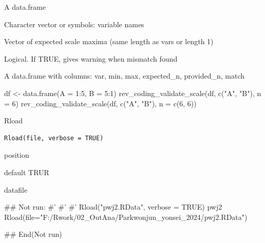 \documentclass[a4paper]{book}
\begin{document}
%
\begin{Arguments}
\begin{ldescription}
\item[\code{data}] A data.frame

\item[\code{vars}] Character vector or symbols: variable names

\item[\code{n}] Vector of expected scale maxima (same length as vars or length 1)

\item[\code{strict}] Logical. If TRUE, gives warning when mismatch found
\end{ldescription}
\end{Arguments}
%
\begin{Value}
A data.frame with columns: var, min, max, expected\_n, provided\_n, match
\end{Value}
%
\begin{Examples}
\begin{ExampleCode}
df <- data.frame(A = 1:5, B = 5:1)
rev_coding_validate_scale(df, c("A", "B"), n = 6)
rev_coding_validate_scale(df, c("A", "B"), n = c(6, 6))
\end{ExampleCode}
\end{Examples}
%
\begin{Description}
Rload
\end{Description}
%
\begin{Usage}
\begin{verbatim}
Rload(file, verbose = TRUE)
\end{verbatim}
\end{Usage}
%
\begin{Arguments}
\begin{ldescription}
\item[\code{file}] position

\item[\code{verbose}] default TRUR
\end{ldescription}
\end{Arguments}
%
\begin{Value}
datafile
\end{Value}
%
\begin{Examples}
\begin{ExampleCode}

## Not run: 
#'
#'
#'
Rload("pwj2.RData", verbose = TRUE)
pwj2 %
Rload(file="F:/Rwork/02_OutAna/Parkwonjun_yonsei_2024/pwj2.RData")

## End(Not run)


\end{ExampleCode}
\end{Examples}
\end{document}
